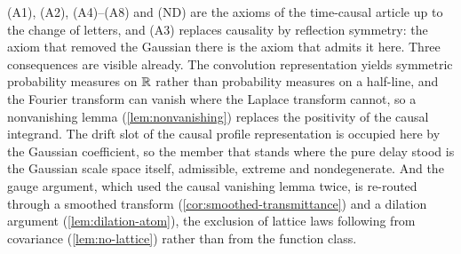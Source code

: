 \begin{remark}\label{rem:provenance-causal}
(A1), (A2), (A4)--(A8) and (ND) are the axioms of the time-causal article
 up to the change of letters, and (A3) replaces causality by
reflection symmetry: the axiom that removed the Gaussian there is the axiom that admits it
here. Three consequences are visible already. The convolution representation yields symmetric
probability measures on $\mathbb{R}$ rather than probability measures on a half-line, and the Fourier
transform can vanish where the Laplace transform cannot, so a nonvanishing lemma
(\ref{lem:nonvanishing}) replaces the positivity of the causal integrand. The drift slot of the
causal profile representation is occupied here by the Gaussian coefficient, so the member that
stands where the pure delay stood is the Gaussian scale space itself, admissible, extreme and
nondegenerate. And the gauge argument, which used the causal vanishing lemma twice, is
re-routed through a smoothed transform (\ref{cor:smoothed-transmittance}) and a dilation
argument (\ref{lem:dilation-atom}), the exclusion of lattice laws following from covariance
(\ref{lem:no-lattice}) rather than from the function class.
\end{remark}

